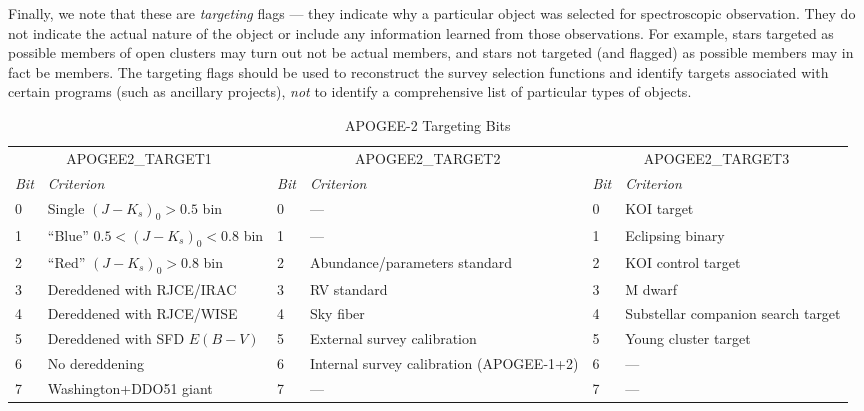 \documentclass[12pt,twocolumn]{emulateapj}
\begin{document}
Finally, we note that these are {\it targeting} flags --- 
they indicate why a particular object
was selected for spectroscopic observation.  They do not indicate the actual nature of
the object or include any information learned from those observations.  
For example, stars targeted as possible members of open clusters may turn out not be actual members,
and stars not targeted (and flagged) as possible members may in fact be members.
The targeting flags should be used to reconstruct the survey selection functions
and identify targets associated with certain programs (such as ancillary projects),
{\it not} to identify a comprehensive list of particular types of objects.

\begin{table*}[!ht] \tablewidth{0 pt}
\caption{APOGEE-2 Targeting Bits}
\tabletypesize{\footnotesize}
\begin{center}
\begin{tabular}{llllll}
\multicolumn{2}{c}{APOGEE2\_TARGET1} & \multicolumn{2}{c}{APOGEE2\_TARGET2} & \multicolumn{2}{c}{APOGEE2\_TARGET3} \\
{\it Bit} & {\it Criterion} & {\it Bit} & {\it Criterion} & {\it Bit} & {\it Criterion} \\
0 & Single $(J-K_s)_0 > 0.5$ bin & 0 & --- & 0 & KOI target \\
1 & ``Blue'' $0.5 < (J-K_s)_0 < 0.8$ bin & 1 & --- & 1 & Eclipsing binary \\
2 & ``Red'' $(J-K_s)_0 > 0.8$ bin & 2 & Abundance/parameters standard & 2 & KOI control target \\
3 & Dereddened with RJCE/IRAC & 3 & RV standard & 3 & M dwarf\\
4 & Dereddened with RJCE/WISE & 4 & Sky fiber & 4 & Substellar companion search target \\
5 & Dereddened with SFD $E(B-V)$ & 5 & External survey calibration & 5 & Young cluster target \\
6 & No dereddening & 6 & Internal survey calibration (APOGEE-1+2) & 6 & --- \\
7 & Washington+DDO51 giant & 7 & --- & 7 & --- \\

\end{tabular}
\end{center}
\end{table*}
\end{document}

